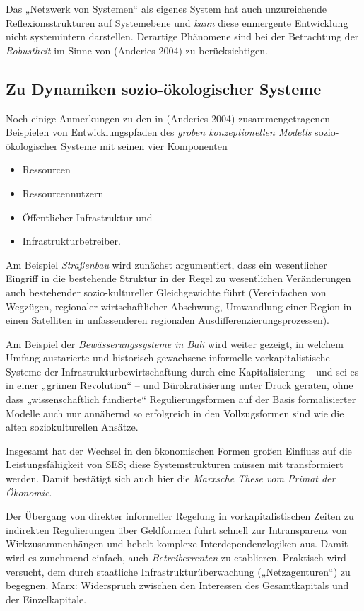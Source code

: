 \documentclass[11pt,a4paper]{article}
\begin{document}
Das „Netzwerk von Systemen“ als eigenes System hat auch unzureichende
Reflexionsstrukturen auf Systemebene und \emph{kann} diese enmergente
Entwicklung nicht systemintern darstellen. Derartige Phänomene sind bei der
Betrachtung der \emph{Robustheit} im Sinne von (Anderies 2004) zu
berücksichtigen.

\subsection{Zu Dynamiken sozio-ökologischer Systeme}

Noch einige Anmerkungen zu den in (Anderies 2004) zusammengetragenen
Beispielen von Entwicklungspfaden des \emph{groben konzeptionellen
Modells} sozio-ökologischer Systeme mit seinen vier Komponenten
\begin{itemize}[noitemsep]
\item Ressourcen
\item Ressourcennutzern
\item Öffentlicher Infrastruktur und
\item Infrastrukturbetreiber.
\end{itemize}

Am Beispiel \emph{Straßenbau} wird zunächst argumentiert, dass ein
wesentlicher Eingriff in die bestehende Struktur in der Regel zu wesentlichen
Veränderungen auch bestehender sozio-kultureller Gleichgewichte führt
(Vereinfachen von Wegzügen, regionaler wirtschaftlicher Abschwung, Umwandlung
einer Region in einen Satelliten in unfassenderen regionalen
Ausdifferenzierungsprozessen).

Am Beispiel der \emph{Bewässerungssysteme in Bali} wird weiter gezeigt, in
welchem Umfang austarierte und historisch gewachsene informelle
vorkapitalistische Systeme der Infrastrukturbewirtschaftung durch eine
Kapitalisierung -- und sei es in einer „grünen Revolution“ -- und
Bürokratisierung unter Druck geraten, ohne dass „wissenschaftlich fundierte“
Regulierungsformen auf der Basis formalisierter Modelle auch nur annähernd so
erfolgreich in den Vollzugsformen sind wie die alten soziokulturellen Ansätze.

Insgesamt hat der Wechsel in den ökonomischen Formen großen Einfluss auf die
Leistungsfähigkeit von SES; diese Systemstrukturen müssen mit transformiert
werden. Damit bestätigt sich auch hier die \emph{Marxsche These vom Primat der
  Ökonomie}.

Der Übergang von direkter informeller Regelung in vorkapitalistischen Zeiten
zu indirekten Regulierungen über Geldformen führt schnell zur Intransparenz
von Wirkzusammenhängen und hebelt komplexe Interdependenzlogiken aus. Damit
wird es zunehmend einfach, auch \emph{Betreiberrenten} zu etablieren.
Praktisch wird versucht, dem durch staatliche Infrastrukturüberwachung
(„Netzagenturen“) zu begegnen.  Marx: Widerspruch zwischen den Interessen des
Gesamtkapitals und der Einzelkapitale.
\end{document}
